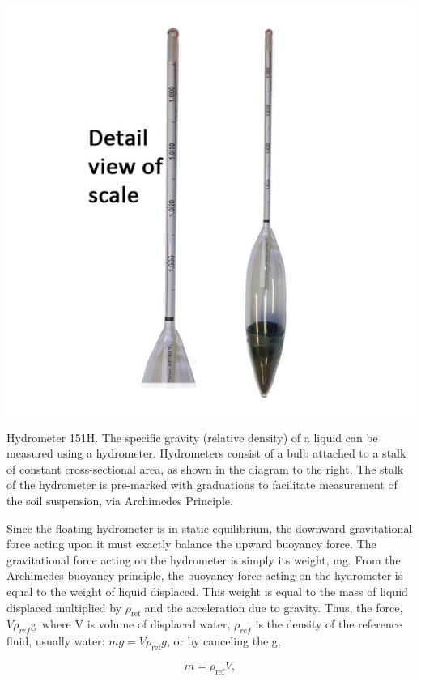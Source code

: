 \documentclass{tufte-handout}
\begin{document}
\begin{marginfigure}
	\includegraphics{Hydrometer151H.jpg}
	\caption{Hydrometer 151H. The specific gravity (relative density) of a liquid can be measured using a hydrometer. Hydrometers consist of a bulb attached to a stalk of constant cross-sectional area, as shown in the diagram to the right. The stalk of the hydrometer is pre-marked with graduations to facilitate measurement of the soil suspension, via Archimedes Principle.}
	\label{fig:Hydrometer151H}
\end{marginfigure}

Since the floating hydrometer is in static equilibrium, the downward gravitational force acting upon it must exactly balance the upward buoyancy force. The gravitational force acting on the hydrometer is simply its weight, mg. From the Archimedes buoyancy principle, the buoyancy force acting on the hydrometer is equal to the weight of liquid displaced. This weight is equal to the mass of liquid displaced multiplied by $\rho_\mathrm{ref}$ and the acceleration due to gravity. Thus, the force, $V\rho_{ref}$g\, where V is volume of displaced water, $\rho_{ref}$ is the density of the reference fluid, usually water:  $mg = V\rho_\mathrm{ref}g$, or by canceling the g, 

\begin{equation}\label{eq:massdisplaced}
m = \rho_\mathrm{ref} V,
\end{equation}
\end{document}

